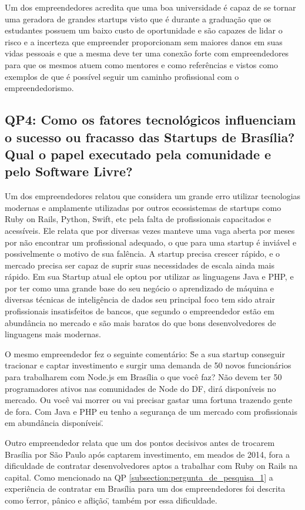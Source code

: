 Um dos empreendedores acredita que uma boa universidade é capaz de se tornar uma geradora de grandes startups visto que é durante a graduação que os estudantes possuem um baixo custo de oportunidade e são capazes de lidar o risco e a incerteza que empreender proporcionam sem maiores danos em suas vidas pessoais e que a mesma deve ter uma conexão forte com empreendedores para que os mesmos atuem como mentores e como referências e vistos como exemplos de que é possível seguir um caminho profissional com o empreendedorismo.

\subsection{QP4: Como os fatores tecnológicos influenciam o sucesso ou fracasso das Startups de Brasília? Qual o papel executado pela comunidade e pelo Software Livre?}
\label{subsection:pergunta_de_pesquisa_4}

Um dos empreendedores relatou que considera um grande erro utilizar tecnologias modernas e amplamente utilizadas por outros ecossistemas de startups como Ruby on Rails, Python, Swift, etc pela falta de profissionais capacitados e acessíveis. Ele relata que por diversas vezes manteve uma vaga aberta por meses por não encontrar um profissional adequado, o que para uma startup é inviável e possivelmente o motivo de sua falência. A startup precisa crescer rápido, e o mercado precisa ser capaz de suprir suas necessidades de escala ainda mais rápido. Em sua Startup atual ele optou por utilizar as linguagens Java e PHP, e por ter como uma grande base do seu negócio o aprendizado de máquina e diversas técnicas de inteligência de dados seu principal foco tem sido atrair profissionais insatisfeitos de bancos, que segundo o empreendedor estão em abundância no mercado e são mais baratos do que bons desenvolvedores de linguagens mais modernas. 

O mesmo empreendedor fez o seguinte comentário: \"Se a sua startup conseguir tracionar e captar investimento e surgir uma demanda de 50 novos funcionários para trabalharem com Node.js em Brasília o que você faz? Não devem ter 50 programadores ativos nas comunidades de Node do DF, dirá disponíveis no mercado. Ou você vai morrer ou vai precisar gastar uma fortuna trazendo gente de fora. Com Java e PHP eu tenho a segurança de um mercado com profissionais em abundância disponíveis\".

Outro empreendedor relata que um dos pontos decisivos antes de trocarem Brasília por São Paulo após captarem investimento, em meados de 2014, fora a dificuldade de contratar desenvolvedores aptos a trabalhar com Ruby on Rails na capital. Como mencionado na QP \ref{subsection:pergunta_de_pesquisa_1} a experiência de contratar em Brasília para um dos empreendedores foi descrita como \"terror, pânico e aflição\", também por essa dificuldade.

